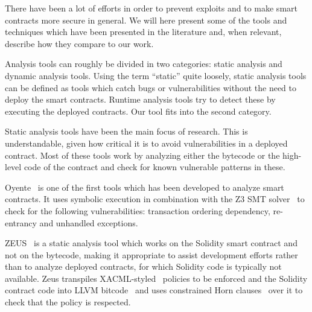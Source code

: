 

There have been a lot of efforts in order to prevent exploits and to make smart contracts more secure in general.
We will here present some of the tools and techniques which have been presented in the literature and, when relevant, describe how they compare to our work.

Analysis tools can roughly be divided in two categories: static analysis and dynamic analysis tools.
Using the term ``static'' quite loosely, static analysis tools can be defined as tools which catch bugs or vulnerabilities without the need to deploy the smart contracts.
Runtime analysis tools try to detect these by executing the deployed contracts.
Our tool fits into the second category.

 Static analysis tools have been the main focus of research.
This is understandable, given how critical it is to avoid vulnerabilities in a deployed contract.
Most of these tools work by analyzing either the bytecode or the high-level code of the contract and check for known vulnerable patterns in these.

Oyente~\cite{Luu2016a} is one of the first tools which has been developed to analyze smart contracts.
It uses symbolic execution in combination with the Z3 SMT solver~\cite{de2008z3} to check for the following vulnerabilities: transaction ordering dependency, re-entrancy and unhandled exceptions.

ZEUS~\cite{DBLP:conf/ndss/KalraGDS18} is a static analysis tool which works on the Solidity smart contract and not on the bytecode, making it appropriate to assist development efforts rather than to analyze deployed contracts, for which Solidity code is typically not available.
Zeus transpiles XACML-styled~\cite{XACML} policies to be enforced and the Solidity contract code into LLVM bitcode~\cite{lattner2004llvm} and uses constrained Horn clauses~\cite{bjorner2012program,mcmillan2007interpolants} over it to check that the policy is respected.

